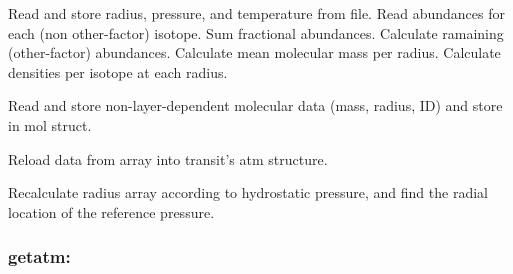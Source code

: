 \documentclass[letterpaper,12pt]{article}
\begin{document}
Read and store radius, pressure, and temperature from file.
Read abundances for each (non other-factor) isotope.
Sum fractional abundances. Calculate ramaining (other-factor) abundances.
Calculate mean molecular mass per radius.
Calculate densities per isotope at each radius. \newline

Read and store non-layer-dependent molecular data (mass, radius, ID)
and store in mol struct. \newline

Reload data from array into transit's atm structure.\newline

Recalculate radius array according to hydrostatic pressure, and find the radial location of the reference pressure.

\subsubsection{getatm:}
\end{document}
